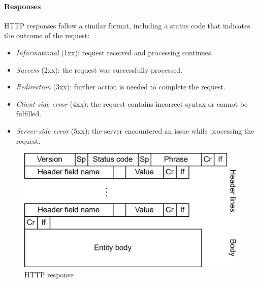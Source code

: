 \paragraph*{Responses}
HTTP responses follow a similar format, including a status code that indicates the outcome of the request:
\begin{itemize}
    \item \textit{Informational} (1xx): request received and processing continues.
    \item \textit{Success} (2xx): the request was successfully processed.
    \item \textit{Redirection} (3xx): further action is needed to complete the request.
    \item \textit{Client-side error} (4xx): the request contains incorrect syntax or cannot be fulfilled.
    \item \textit{Server-side error} (5xx): the server encountered an issue while processing the request.
\end{itemize}
\begin{figure}[H]
    \centering
    \includegraphics[width=0.5\linewidth]{images/iot8.png}
    \caption{HTTP response}
\end{figure}
